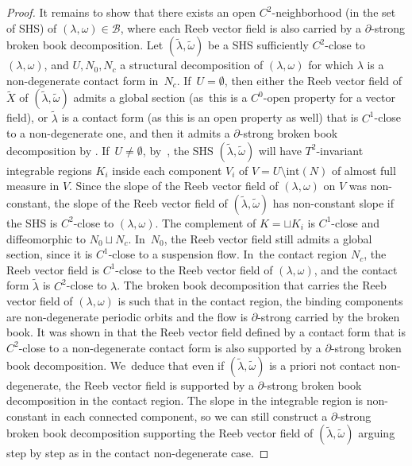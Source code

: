 \documentclass[10pt]{amsart}
\theoremstyle{definition}
\begin{document}
\begin{proof}
It remains to show that there exists an open $C^2$-neighborhood (in the set of SHS) of $(\lambda,\omega)\in \mathcal{B}$, where each Reeb vector field is also carried by a $\partial$-strong broken book decomposition. Let $(\widetilde \lambda, \widetilde \omega)$ be a SHS sufficiently $C^2$-close to $(\lambda,\omega)$, and $U, N_0, N_c$ a structural decomposition of $(\lambda,\omega)$ for which $\lambda$ is a non-degenerate contact form in~$N_c$. If~$U=\emptyset$, then either the Reeb vector field of $\widetilde X$ of $(\widetilde \lambda, \widetilde \omega)$ admits a global section (as~this is a $C^0$-open property for a vector field), or $\widetilde \lambda$ is a contact form (as this is an open property as well) that is $C^1$-close to a non-degenerate one, and then it admits a $\partial$-strong broken book decomposition by \cite[Th.\,1.1]{CDR}. If~$U\neq \emptyset$, by~\cite[Th.\,3.7]{CV1}, the SHS $(\widetilde \lambda, \widetilde \omega)$ will have $T^2$-invariant integrable regions $K_i$ inside each component $V_i$ of $V=U\setminus \text{int}(N)$ of almost full measure in $V$. Since the slope of the Reeb vector field of $(\lambda,\omega)$ on $V$ was non-constant, the slope of the Reeb vector field of $(\widetilde \lambda, \widetilde \omega)$ has non-constant slope if the SHS is $C^2$-close to $(\lambda,\omega)$. The complement of $K=\sqcup K_i$ is $C^1$-close and diffeomorphic to $N_0\sqcup N_c$. In~$N_0$, the Reeb vector field still admits a global section, since it is $C^1$-close to a suspension flow. In~the contact region $N_c$, the Reeb vector field is $C^1$-close to the Reeb vector field of $(\lambda, \omega)$, and the contact form $\widetilde \lambda$ is $C^2$-close to $\lambda$. The broken book decomposition that carries the Reeb vector field of $(\lambda,\omega)$ is such that in the contact region, the binding components are non-degenerate periodic orbits and the flow is $\partial$-strong carried by the broken book. It was shown in \cite[\S 4.7]{CDR} that the Reeb vector field defined by a contact form that is $C^2$-close to a non-degenerate contact form is also supported by a $\partial$-strong broken book decomposition. We~deduce that even if
$(\widetilde \lambda, \widetilde \omega)$ is a priori not contact non-degenerate, the Reeb vector field is supported by a $\partial$-strong broken book decomposition in the contact region.
The slope in the integrable region is non-constant in each connected component, so we can still construct a $\partial$-strong broken book decomposition supporting the Reeb vector field of $(\widetilde \lambda, \widetilde \omega)$ arguing step by step as in the contact non-degenerate case.
\end{proof}
\end{document}
